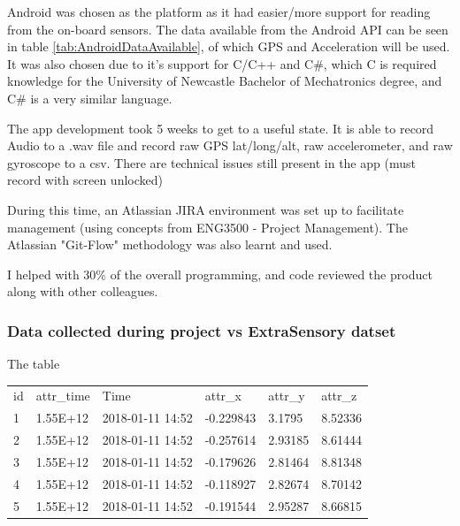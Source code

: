\documentclass{UoNMCHA}
\numberwithin{equation}{section}
\begin{document}

Android was chosen as the platform as it had easier/more support for reading from the on-board sensors. The data available from the Android API can be seen in table \ref{tab:AndroidDataAvailable}, of which GPS and Acceleration will be used. It was also chosen due to it's support for C/C++ and C\#, which C is required knowledge for the University of Newcastle Bachelor of Mechatronics degree, and C\# is a very similar language.

The app development took 5 weeks to get to a useful state. It is able to record Audio to a .wav file and record raw GPS lat/long/alt, raw accelerometer, and raw gyroscope to a csv. There are technical issues still present in the app (must record with screen unlocked)

During this time, an Atlassian JIRA environment was set up to facilitate management (using concepts from ENG3500 - Project Management). The Atlassian "Git-Flow" methodology was also learnt and used.

I helped with 30\% of the overall programming, and code reviewed the product along with other colleagues.

\subsubsection{Data collected during project vs ExtraSensory datset}
The table 

\begin{table}[]
    \begin{tabular}{llllll}
    id & attr\_time & Time             & attr\_x   & attr\_y & attr\_z \\
    1  & 1.55E+12   & 2018-01-11 14:52 & -0.229843 & 3.1795  & 8.52336 \\
    2  & 1.55E+12   & 2018-01-11 14:52 & -0.257614 & 2.93185 & 8.61444 \\
    3  & 1.55E+12   & 2018-01-11 14:52 & -0.179626 & 2.81464 & 8.81348 \\
    4  & 1.55E+12   & 2018-01-11 14:52 & -0.118927 & 2.82674 & 8.70142 \\
    5  & 1.55E+12   & 2018-01-11 14:52 & -0.191544 & 2.95287 & 8.66815
    \end{tabular}
    \end{table}
\end{document}
